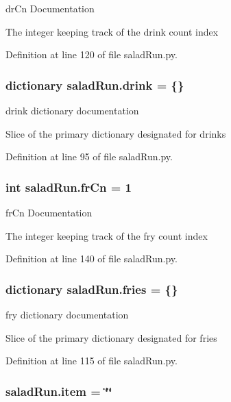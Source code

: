 dr\-Cn Documentation 

The integer keeping track of the drink count index 

Definition at line 120 of file salad\-Run.\-py.

\hypertarget{namespacesaladRun_adf811d21a1ac0493c9b3d02f68415fe0}{
\subsubsection[{drink}]{\setlength{\rightskip}{0pt plus 5cm}dictionary salad\-Run.\-drink = \{\}}}\label{namespacesaladRun_adf811d21a1ac0493c9b3d02f68415fe0}


drink dictionary documentation 

Slice of the primary dictionary designated for drinks 

Definition at line 95 of file salad\-Run.\-py.

\hypertarget{namespacesaladRun_af2a4057df66bdbf7a206b115d6fe9d85}{
\subsubsection[{fr\-Cn}]{\setlength{\rightskip}{0pt plus 5cm}int salad\-Run.\-fr\-Cn = 1}}\label{namespacesaladRun_af2a4057df66bdbf7a206b115d6fe9d85}


fr\-Cn Documentation 

The integer keeping track of the fry count index 

Definition at line 140 of file salad\-Run.\-py.

\hypertarget{namespacesaladRun_af558c903f050596ef6723fe109071567}{
\subsubsection[{fries}]{\setlength{\rightskip}{0pt plus 5cm}dictionary salad\-Run.\-fries = \{\}}}\label{namespacesaladRun_af558c903f050596ef6723fe109071567}


fry dictionary documentation 

Slice of the primary dictionary designated for fries 

Definition at line 115 of file salad\-Run.\-py.

\hypertarget{namespacesaladRun_af7102dd40841709ad281aeb6bc614451}{
\subsubsection[{item}]{\setlength{\rightskip}{0pt plus 5cm}salad\-Run.\-item = \char`\"{}\char`\"{}}}\label{namespacesaladRun_af7102dd40841709ad281aeb6bc614451}


